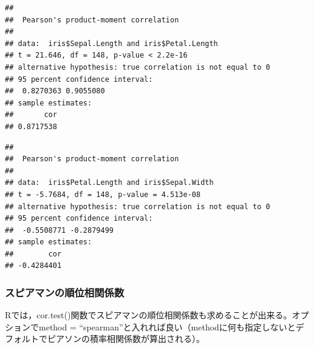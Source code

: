 \documentclass[]{article}
\newenvironment{Shaded}{\begin{snugshade}}{\end{snugshade}}
\newcommand{\KeywordTok}[1]{\textcolor[rgb]{0.13,0.29,0.53}{\textbf{#1}}}
\newcommand{\DataTypeTok}[1]{\textcolor[rgb]{0.13,0.29,0.53}{#1}}
\newcommand{\StringTok}[1]{\textcolor[rgb]{0.31,0.60,0.02}{#1}}
\newcommand{\OperatorTok}[1]{\textcolor[rgb]{0.81,0.36,0.00}{\textbf{#1}}}
\newcommand{\NormalTok}[1]{#1}
\begin{document}
\begin{Shaded}
\end{Shaded}

\begin{verbatim}
## 
##  Pearson's product-moment correlation
## 
## data:  iris$Sepal.Length and iris$Petal.Length
## t = 21.646, df = 148, p-value < 2.2e-16
## alternative hypothesis: true correlation is not equal to 0
## 95 percent confidence interval:
##  0.8270363 0.9055080
## sample estimates:
##       cor 
## 0.8717538
\end{verbatim}

\begin{Shaded}
\end{Shaded}

\begin{verbatim}
## 
##  Pearson's product-moment correlation
## 
## data:  iris$Petal.Length and iris$Sepal.Width
## t = -5.7684, df = 148, p-value = 4.513e-08
## alternative hypothesis: true correlation is not equal to 0
## 95 percent confidence interval:
##  -0.5508771 -0.2879499
## sample estimates:
##        cor 
## -0.4284401
\end{verbatim}

\subsubsection{スピアマンの順位相関係数}

Rでは，cor.test()関数でスピアマンの順位相関係数も求めることが出来る。オプションでmethod
=
``spearman''と入れれば良い（methodに何も指定しないとデフォルトでピアソンの積率相関係数が算出される）。

\begin{Shaded}
\end{Shaded}
\end{document}
